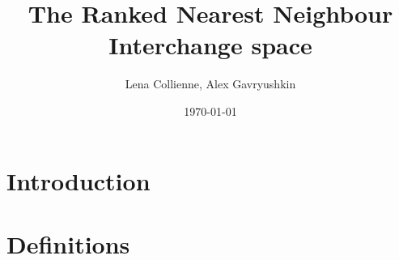 \documentclass[11pt, a4paper]{article}
\title{The Ranked Nearest Neighbour Interchange space}
\date{\today}
\author{Lena Collienne, Alex Gavryushkin}
\begin{document}
\maketitle

\begin{abstract}

\end{abstract}


\section{Introduction}



\section{Definitions}

\end{document}
